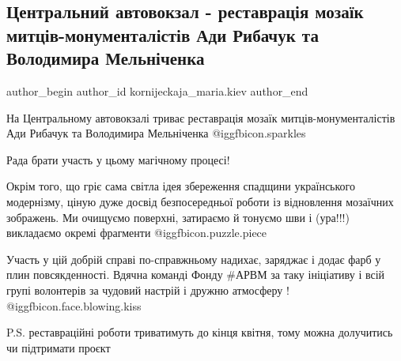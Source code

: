  
 
 
 
 
 
\subsection{Центральний автовокзал - реставрація мозаїк митців-монументалістів Ади Рибачук та Володимира Мельніченка}
\label{sec:21_04_2021.fb.kornijeckaja_maria.kiev.1.avtovokzal_restavracia_mozaiki}
 
\ifcmt
 author_begin
   author_id kornijeckaja_maria.kiev
 author_end
\fi

На Центральному автовокзалі триває реставрація мозаїк митців-монументалістів
Ади Рибачук та Володимира Мельніченка  @igg{fbicon.sparkles} 

Рада брати участь у цьому магічному процесі!

Окрім того, що гріє сама світла ідея збереження спадщини українського
модернізму, ціную дуже досвід безпосередньої роботи із відновлення мозаїчних
зображень. Ми очищуємо поверхні, затираємо й тонуємо шви і (ура!!!) викладаємо
окремі фрагменти  @igg{fbicon.puzzle.piece} 


Участь у цій добрій справі по-справжньому надихає, заряджає і додає фарб у плин
повсякденності. Вдячна команді Фонду \#АРВМ  за таку ініціативу і всій групі
волонтерів за чудовий настрій і дружню атмосферу !  @igg{fbicon.face.blowing.kiss} 

P.S. реставраційні роботи триватимуть до кінця квітня, тому можна долучитись чи
підтримати проєкт

